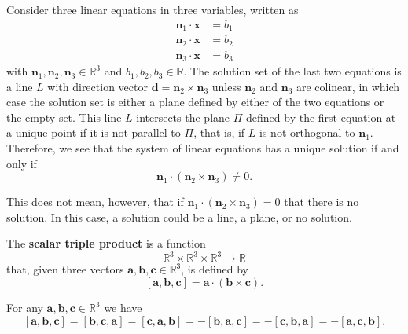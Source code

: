 Consider three linear equations in three variables, written as
\begin{align*}
    \bm n_1\cdot\bm x&=b_1\\
    \bm n_2\cdot\bm x&=b_2\\
    \bm n_3\cdot\bm x&=b_3
\end{align*}
with $\bm n_1,\bm n_2,\bm n_3\in\mathbb R^3$ and $b_1,b_2,b_3\in\mathbb R$. The solution set of the last two equations is a line $L$ with direction vector $\bm d=\bm n_2\times\bm n_3$ unless $\bm n_2$ and $\bm n_3$ are colinear, in which case the solution set is either a plane defined by either of the two equations or the empty set. This line $L$ intersects the plane $\Pi$ defined by the first equation at a unique point if it is not parallel to $\Pi$, that is, if $L$ is not orthogonal to $\bm n_1$. Therefore, we see that the system of linear equations has a unique solution if and only if
\[\bm n_1\cdot(\bm n_2\times\bm n_3)\neq0.\]

This does not mean, however, that if $\bm n_1\cdot(\bm n_2\times\bm n_3)=0$ that there is no solution. In this case, a solution could be a line, a plane, or no solution. 

\begin{definition}
    The \textbf{scalar triple product} is a function
    \[\mathbb R^3\times\mathbb R^3\times\mathbb R^3\to\mathbb R\]
    that, given three vectors $\bm a,\bm b,\bm c\in\mathbb R^3$, is defined by
    \[[\bm a,\bm b,\bm c]=\bm a\cdot(\bm b\times\bm c).\]
\end{definition}

\begin{lemma}
    For any $\bm a,\bm b,\bm c\in\mathbb R^3$ we have
    \[[\bm a,\bm b,\bm c]=[\bm b,\bm c,\bm a]=[\bm c,\bm a,\bm b]=-[\bm b,\bm a,\bm c]=-[\bm c,\bm b,\bm a]=-[\bm a,\bm c,\bm b].\]
\end{lemma}

